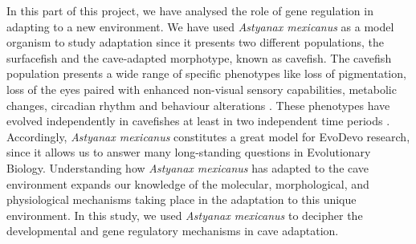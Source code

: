 In this part of this project, we have analysed the role of gene regulation in adapting to a new environment. We have used \textit{Astyanax mexicanus} as a model organism to study adaptation since it presents two different populations, the surfacefish and the cave-adapted morphotype, known as cavefish. The cavefish population presents a wide range of specific phenotypes like loss of pigmentation, loss of the eyes paired with enhanced non-visual sensory capabilities, metabolic changes, circadian rhythm and behaviour alterations \parencite{jeffery_astyanax_2020, oliva_characterizing_2022}. These phenotypes have evolved independently in cavefishes at least in two independent time periods \parencite{fumey_evidence_2018, herman_role_2018, moran_selection-driven_2023}. Accordingly,  \textit{Astyanax mexicanus} constitutes a great model for EvoDevo research, since it allows us to answer many long-standing questions in Evolutionary Biology. Understanding how \textit{Astyanax mexicanus} has adapted to the cave environment expands our knowledge of the molecular, morphological, and physiological mechanisms taking place in the adaptation to this unique environment. In this study, we used \textit{Astyanax mexicanus} to decipher the developmental and gene regulatory mechanisms in cave adaptation. 

